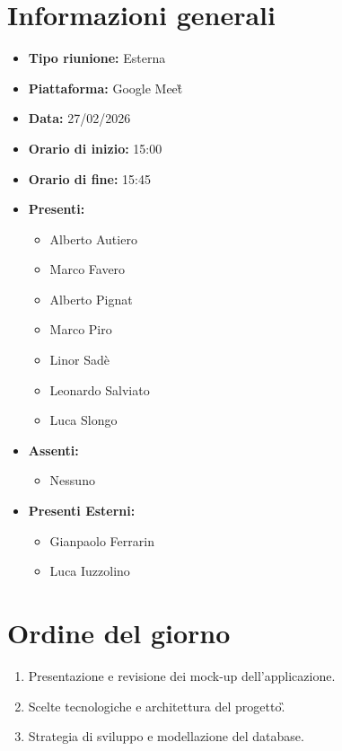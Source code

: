 \documentclass[a4paper,12pt]{article}
\begin{document}
\newpage

\tableofcontents
\newpage

\section{Informazioni generali}

\begin{itemize}
    \item \textbf{Tipo riunione:} Esterna
    \item \textbf{Piattaforma:} Google Meet\G
    \item \textbf{Data:} 27/02/2026
    \item \textbf{Orario di inizio:} 15:00
    \item \textbf{Orario di fine:} 15:45
    \item \textbf{Presenti:}
    \begin{itemize}[leftmargin=1.5em, itemsep=3pt, label={\rule[0.5ex]{0.4em}{0.4em}}]
        \item Alberto Autiero
        \item Marco Favero
        \item Alberto Pignat
        \item Marco Piro
        \item Linor Sadè
        \item Leonardo Salviato
        \item Luca Slongo
    \end{itemize}
    \item \textbf{Assenti:} 
    \begin{itemize}[leftmargin=1.5em, itemsep=3pt, label={\rule[0.5ex]{0.4em}{0.4em}}]
    \item Nessuno
    \end{itemize}
    \item \textbf{Presenti Esterni:}
    \begin{itemize}[leftmargin=1.5em, itemsep=3pt, label={\rule[0.5ex]{0.4em}{0.4em}}]
      \item Gianpaolo Ferrarin
      \item Luca Iuzzolino
    \end{itemize}
\end{itemize}

\section{Ordine del giorno}

\begin{enumerate}
    \item \label{itm:mockup} Presentazione e revisione dei mock-up dell'applicazione.
    \item \label{itm:arch} Scelte tecnologiche e architettura del progetto\G.
    \item \label{itm:dev} Strategia di sviluppo e modellazione del database.
\end{enumerate}
\end{document}
